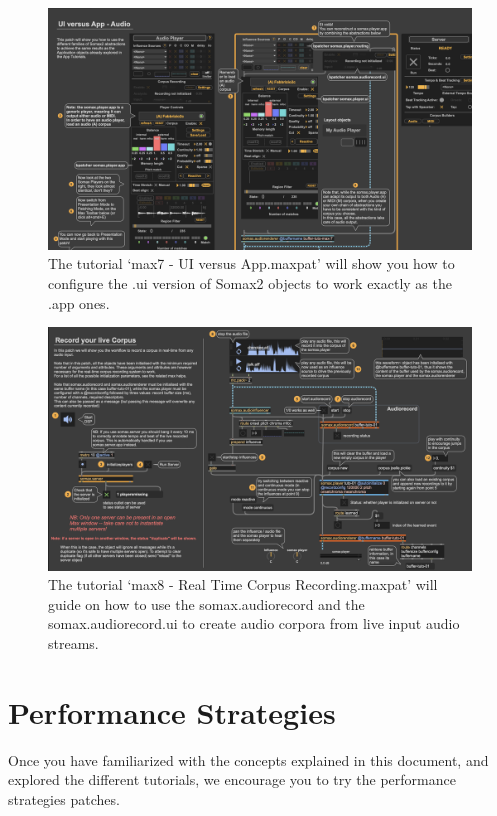 \begin{figure}[H]
    \centering        
 	\includegraphics[width=1\textwidth]{img/ui_vs_app_tuto.png}
    \caption{The tutorial `max7 - UI versus App.maxpat' will show you how to configure the .ui version of Somax2 objects to work exactly as the .app ones.}
    \label{fig:ui_vs_app_tuto}
\end{figure}

\begin{figure}[H]
    \centering        
 	\includegraphics[width=1\textwidth]{img/real_time_corpus_tuto.png}
    \caption{The tutorial `max8 - Real Time Corpus Recording.maxpat' will guide on how to use the somax.audiorecord and the somax.audiorecord.ui to create audio corpora from live input audio streams.}
    \label{fig:real_time_corpus_tuto}
\end{figure}



\section{Performance Strategies}
Once you have familiarized with the concepts explained in this document, and explored the different tutorials, we encourage you to try the performance strategies patches.

